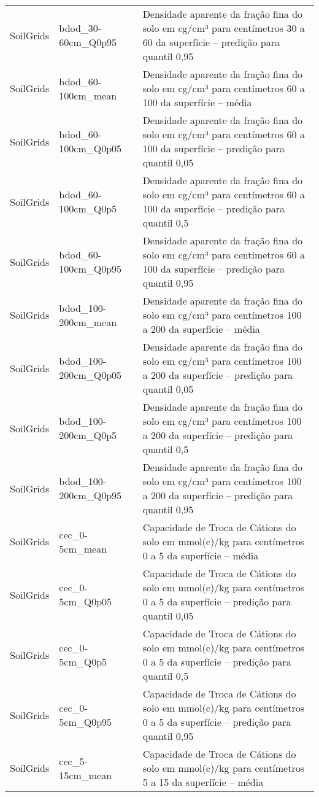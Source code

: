 \begin{longtable}{@{} p{4cm} p{4cm} p{8cm} @{}}
	SoilGrids &
	bdod\_30-60cm\_Q0p95 &
	Densidade aparente da fração fina do solo em cg/cm³ para centímetros 30 a 60 da superfície – predição para quantil 0,95 \\
	SoilGrids &
	bdod\_60-100cm\_mean &
	Densidade aparente da fração fina do solo em cg/cm³ para centímetros 60 a 100 da superfície – média \\
	SoilGrids &
	bdod\_60-100cm\_Q0p05 &
	Densidade aparente da fração fina do solo em cg/cm³ para centímetros 60 a 100 da superfície – predição para quantil 0,05 \\
	SoilGrids &
	bdod\_60-100cm\_Q0p5 &
	Densidade aparente da fração fina do solo em cg/cm³ para centímetros 60 a 100 da superfície – predição para quantil 0,5 \\
	SoilGrids &
	bdod\_60-100cm\_Q0p95 &
	Densidade aparente da fração fina do solo em cg/cm³ para centímetros 60 a 100 da superfície – predição para quantil 0,95 \\
	SoilGrids &
	bdod\_100-200cm\_mean &
	Densidade aparente da fração fina do solo em cg/cm³ para centímetros 100 a 200 da superfície – média \\
	SoilGrids &
	bdod\_100-200cm\_Q0p05 &
	Densidade aparente da fração fina do solo em cg/cm³ para centímetros 100 a 200 da superfície – predição para quantil 0,05 \\
	SoilGrids &
	bdod\_100-200cm\_Q0p5 &
	Densidade aparente da fração fina do solo em cg/cm³ para centímetros 100 a 200 da superfície – predição para quantil 0,5 \\
	SoilGrids &
	bdod\_100-200cm\_Q0p95 &
	Densidade aparente da fração fina do solo em cg/cm³ para centímetros 100 a 200 da superfície – predição para quantil 0,95 \\
	SoilGrids &
	cec\_0-5cm\_mean &
	Capacidade de Troca de Cátions do solo em mmol(c)/kg para centímetros 0 a 5 da superfície – média \\
	SoilGrids &
	cec\_0-5cm\_Q0p05 &
	Capacidade de Troca de Cátions do solo em mmol(c)/kg para centímetros 0 a 5 da superfície – predição para quantil 0,05 \\
	SoilGrids &
	cec\_0-5cm\_Q0p5 &
	Capacidade de Troca de Cátions do solo em mmol(c)/kg para centímetros 0 a 5 da superfície – predição para quantil 0,5 \\
	SoilGrids &
	cec\_0-5cm\_Q0p95 &
	Capacidade de Troca de Cátions do solo em mmol(c)/kg para centímetros 0 a 5 da superfície – predição para quantil 0,95 \\
	SoilGrids &
	cec\_5-15cm\_mean &
	Capacidade de Troca de Cátions do solo em mmol(c)/kg para centímetros 5 a 15 da superfície – média \\

\end{longtable}

